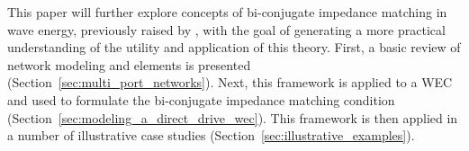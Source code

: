 \documentclass[lettersize,journal]{IEEEtran}
\newcommand{\rc}[1]{\textcolor{red}{#1}}
\begin{document}
This paper will further explore concepts of bi-conjugate impedance matching in wave energy, previously raised by \cite{Bacelli:2021aa}, with the goal of generating a more practical understanding of the utility and application of this theory. 
First, a basic review of network modeling and elements is presented (Section~\ref{sec:multi_port_networks}).
Next, this framework is applied to a WEC and used to formulate the bi-conjugate impedance matching condition (Section~\ref{sec:modeling_a_direct_drive_wec}).
This framework is then applied in a number of illustrative case studies (Section~\ref{sec:illustrative_examples}).






\end{document}
